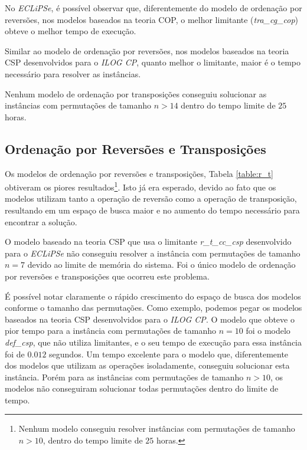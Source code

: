 No \textit{ECLiPSe}, é possível observar que, diferentemente do modelo
de ordenação por reversões, nos modelos baseados na teoria COP, o
melhor limitante (\textit{tra\_cg\_cop}) obteve o melhor tempo de
execução. 

Similar ao modelo de ordenação por reversões, nos modelos baseados na
teoria CSP desenvolvidos para o \textit{ILOG CP}, quanto melhor o
limitante, maior é o tempo necessário para resolver as instâncias.

Nenhum modelo de ordenação por transposições conseguiu solucionar as
instâncias com permutações de tamanho $n > 14$ dentro do tempo limite
de $25$ horas.



\subsection{Ordenação por Reversões e Transposições}
\label{subsec:analise_r_t}
Os modelos de ordenação por reversões e transposições,
Tabela \ref{table:r_t} obtiveram os piores resultados\footnote{Nenhum
modelo conseguiu resolver instâncias com permutações de tamanho $n >
10$, dentro do tempo limite de $25$ horas.}. Isto já era esperado,
devido ao fato que os modelos utilizam tanto a operação de reversão
como a operação de transposição, resultando em um espaço de busca
maior e no aumento do tempo necessário para encontrar a solução.

O modelo baseado na teoria CSP que usa o
limitante \textit{r\_t\_cc\_csp} desenvolvido para o \textit{ECLiPSe}
não conseguiu resolver a instância com permutações de tamanho $n = 7$
devido ao limite de memória do sistema. Foi o único modelo de
ordenação por reversões e transposições que ocorreu este problema.

É possível notar claramente o rápido crescimento do espaço de busca
dos modelos conforme o tamanho das permutações. Como exemplo, podemos
pegar os modelos baseados na teoria CSP desenvolvidos para
o \textit{ILOG CP}. O modelo que obteve o pior tempo para a instância
com permutações de tamanho $n = 10$ foi o modelo \textit{def\_csp},
que não utiliza limitantes, e o seu tempo de execução para essa
instância foi de $0.012$ segundos. Um tempo excelente para o modelo
que, diferentemente dos modelos que utilizam as operações
isoladamente, conseguiu solucionar esta instância. Porém para as
instâncias com permutações de tamanho $n > 10$, os modelos não
conseguiram solucionar todas permutações dentro do limite de tempo.

